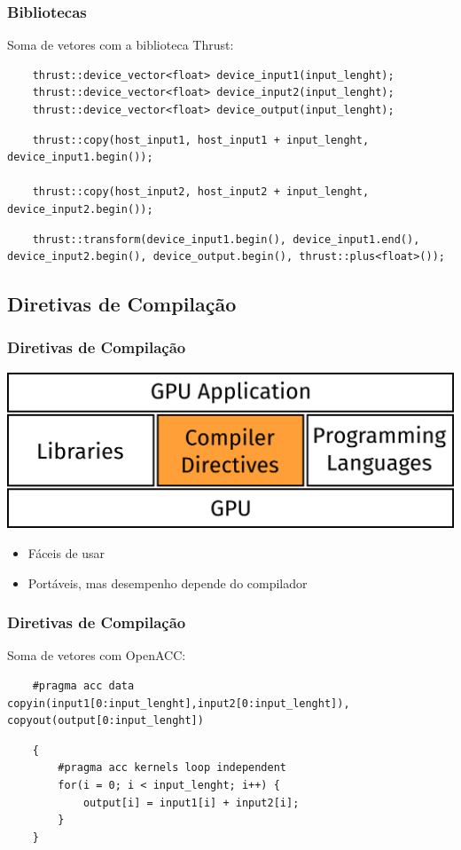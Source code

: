 \documentclass[10pt, compress]{beamer}
\begin{document}
\begin{frame}[fragile]
    \frametitle{Bibliotecas}
    Soma de vetores com a biblioteca \alert{Thrust}:
    \begin{lstlisting}
    thrust::device_vector<float> device_input1(input_lenght);
    thrust::device_vector<float> device_input2(input_lenght);
    thrust::device_vector<float> device_output(input_lenght);
    \end{lstlisting}
    \pause
    \begin{lstlisting}
    thrust::copy(host_input1, host_input1 + input_lenght, device_input1.begin());

    thrust::copy(host_input2, host_input2 + input_lenght, device_input2.begin());
    \end{lstlisting}
    \pause
    \begin{lstlisting}
    thrust::transform(device_input1.begin(), device_input1.end(), device_input2.begin(), device_output.begin(), thrust::plus<float>());
    \end{lstlisting}
\end{frame}

\subsection{Diretivas de Compilação}

\begin{frame}
    \frametitle{Diretivas de Compilação}
    \begin{center}
        \includegraphics[width=.6\textwidth]{accel_apps_comp}
    \end{center}
    \pause

    \begin{itemize}
        \item Fáceis de usar
            \pause
        \item Portáveis, mas desempenho depende do compilador
    \end{itemize}
\end{frame}

\begin{frame}[fragile]
    \frametitle{Diretivas de Compilação}
    Soma de vetores com \alert{OpenACC}:
    \begin{lstlisting}
    #pragma acc data copyin(input1[0:input_lenght],input2[0:input_lenght]), copyout(output[0:input_lenght])
    \end{lstlisting}
    \pause
    \begin{lstlisting}
    {
        #pragma acc kernels loop independent
        for(i = 0; i < input_lenght; i++) {
            output[i] = input1[i] + input2[i];
        }
    }
    \end{lstlisting}
\end{frame}
\end{document}
